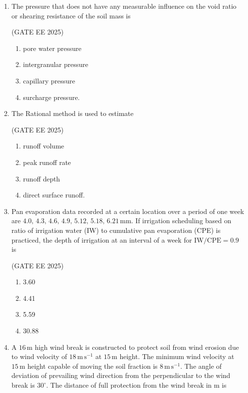 \documentclass[journal,12pt,onecolumn]{IEEEtran}
\theoremstyle{remark}
\begin{document}
\begin{enumerate}
\item The pressure that does not have any measurable influence on the void ratio or shearing resistance of the soil mass is\

\hfill(GATE EE 2025)

\begin{multicols}{2}
\begin{enumerate}
    \item pore water pressure
    \item intergranular pressure 
    \item capillary pressure 
    \item  surcharge pressure.
\end{enumerate}
\end{multicols}

\item The Rational method is used to estimate\

\hfill(GATE EE 2025)

\begin{multicols}{2}
\begin{enumerate}
    \item runoff volume
    \item peak runoff rate
    \item runoff depth
    \item direct surface runoff.
\end{enumerate}
\end{multicols} 

\item Pan evaporation data recorded at a certain location over a period of one week are $4.0,\, 4.3,\, 4.6,\, 4.9,\, 5.12,\, 5.18,\, 6.21\,\mathrm{mm}$. If irrigation scheduling based on ratio of irrigation water (IW) to cumulative pan evaporation (CPE) is practiced, the depth of irrigation at an interval of a week for $\mathrm{IW/CPE}=0.9$ is\

\hfill(GATE EE 2025)

\begin{multicols}{4}
\begin{enumerate}
    \item 3.60
    \item 4.41
    \item 5.59
    \item 30.88
\end{enumerate}
\end{multicols}

\item A $16\,\mathrm{m}$ high wind break is constructed to protect soil from wind erosion due to wind velocity of $18\,\mathrm{m\,s^{-1}}$ at $15\,\mathrm{m}$ height. The minimum wind velocity at $15\,\mathrm{m}$ height capable of moving the soil fraction is $8\,\mathrm{m\,s^{-1}}$. The angle of deviation of prevailing wind direction from the perpendicular to the wind break is $30^{\circ}$. The distance of full protection from the wind break in m is\


\end{enumerate}
\end{document}
